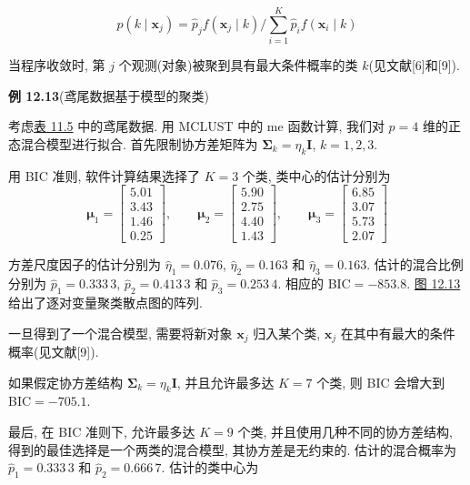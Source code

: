 
\[
p(k\mid \mathbf{x}_j) = \hat{p}_j f(\mathbf{x}_j\mid k)\Big/\sum_{i=1}^{K}\hat{p}_i f(\mathbf{x}_i\mid k)
\]

当程序收敛时, 第 $j$ 个观测(对象)被聚到具有最大条件概率的类 $k$(见文献[6]和[9]).

\noindent\textbf{例 12.13}\quad (鸢尾数据基于模型的聚类)

考虑\hyperref[tab:11.5]{表 11.5} 中的鸢尾数据. 用 MCLUST 中的 me 函数计算, 我们对 $p=4$ 维的正态混合模型进行拟合. 首先限制协方差矩阵为 $\boldsymbol{\Sigma}_k=\eta_k\mathbf{I}$, $k=1,2,3$.

用 BIC 准则, 软件计算结果选择了 $K=3$ 个类, 类中心的估计分别为
\[
\boldsymbol{\mu}_1=\begin{bmatrix}5.01\\3.43\\1.46\\0.25\end{bmatrix}, \qquad
\boldsymbol{\mu}_2=\begin{bmatrix}5.90\\2.75\\4.40\\1.43\end{bmatrix}, \qquad
\boldsymbol{\mu}_3=\begin{bmatrix}6.85\\3.07\\5.73\\2.07\end{bmatrix}
\]

方差尺度因子的估计分别为 $\hat{\eta}_1=0.076$, $\hat{\eta}_2=0.163$ 和 $\hat{\eta}_3=0.163$. 估计的混合比例分别为 $\hat{p}_1=0.333\,3$, $\hat{p}_2=0.413\,3$ 和 $\hat{p}_3=0.253\,4$. 相应的 BIC$=-853.8$. \hyperref[fig:12.13]{图 12.13} 给出了逐对变量聚类散点图的阵列.

\begin{mvfigure}
\label{fig:12.13}
\end{mvfigure}

一旦得到了一个混合模型, 需要将新对象 $\mathbf{x}_j$ 归入某个类, $\mathbf{x}_j$ 在其中有最大的条件概率(见文献[9]).

如果假定协方差结构 $\boldsymbol{\Sigma}_k=\eta_k\mathbf{I}$, 并且允许最多达 $K=7$ 个类, 则 BIC 会增大到 BIC$=-705.1$.

最后, 在 BIC 准则下, 允许最多达 $K=9$ 个类, 并且使用几种不同的协方差结构, 得到的最佳选择是一个两类的混合模型, 其协方差是无约束的. 估计的混合概率为 $\hat{p}_1=0.333\,3$ 和 $\hat{p}_2=0.666\,7$. 估计的类中心为
